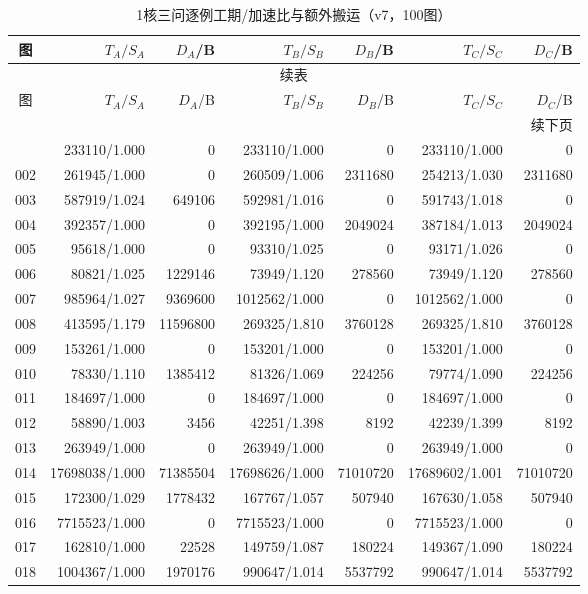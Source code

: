 \begin{longtable}{crrrrrr}
\caption{1核三问逐例工期/加速比与额外搬运（v7，100图）}\label{tab:detail-1}\\
\toprule
图 & $T_A/S_A$ & $D_A$/B & $T_B/S_B$ & $D_B$/B & $T_C/S_C$ & $D_C$/B \\
\midrule
\endfirsthead
\multicolumn{7}{c}{续表}\\
\toprule
图 & $T_A/S_A$ & $D_A$/B & $T_B/S_B$ & $D_B$/B & $T_C/S_C$ & $D_C$/B \\
\midrule
\endhead
\midrule\multicolumn{7}{r}{续下页}\\
\endfoot
\bottomrule
\endlastfoot
001 & 233110/1.000 & 0 & 233110/1.000 & 0 & 233110/1.000 & 0 \\
002 & 261945/1.000 & 0 & 260509/1.006 & 2311680 & 254213/1.030 & 2311680 \\
003 & 587919/1.024 & 649106 & 592981/1.016 & 0 & 591743/1.018 & 0 \\
004 & 392357/1.000 & 0 & 392195/1.000 & 2049024 & 387184/1.013 & 2049024 \\
005 & 95618/1.000 & 0 & 93310/1.025 & 0 & 93171/1.026 & 0 \\
006 & 80821/1.025 & 1229146 & 73949/1.120 & 278560 & 73949/1.120 & 278560 \\
007 & 985964/1.027 & 9369600 & 1012562/1.000 & 0 & 1012562/1.000 & 0 \\
008 & 413595/1.179 & 11596800 & 269325/1.810 & 3760128 & 269325/1.810 & 3760128 \\
009 & 153261/1.000 & 0 & 153201/1.000 & 0 & 153201/1.000 & 0 \\
010 & 78330/1.110 & 1385412 & 81326/1.069 & 224256 & 79774/1.090 & 224256 \\
011 & 184697/1.000 & 0 & 184697/1.000 & 0 & 184697/1.000 & 0 \\
012 & 58890/1.003 & 3456 & 42251/1.398 & 8192 & 42239/1.399 & 8192 \\
013 & 263949/1.000 & 0 & 263949/1.000 & 0 & 263949/1.000 & 0 \\
014 & 17698038/1.000 & 71385504 & 17698626/1.000 & 71010720 & 17689602/1.001 & 71010720 \\
015 & 172300/1.029 & 1778432 & 167767/1.057 & 507940 & 167630/1.058 & 507940 \\
016 & 7715523/1.000 & 0 & 7715523/1.000 & 0 & 7715523/1.000 & 0 \\
017 & 162810/1.000 & 22528 & 149759/1.087 & 180224 & 149367/1.090 & 180224 \\
018 & 1004367/1.000 & 1970176 & 990647/1.014 & 5537792 & 990647/1.014 & 5537792 \\

\end{longtable}
